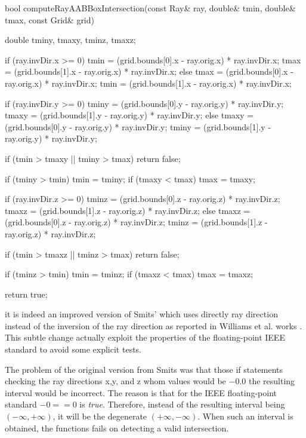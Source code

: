 \documentclass[12pt,a4paper]{extarticle}
\newcommand{\linespace}{\vspace{0pt}}
\begin{document}
\begin{cpp}[caption={Ray-box intersection checking function that also return the points in space along the ray of intersection.},label=code:intersection]
bool computeRayAABBoxIntersection(const Ray& ray, 
		double& tmin, double& tmax, const Grid& grid) {
	double  tminy, tmaxy, tminz, tmaxz;

	if (ray.invDir.x >= 0) {
		tmin = (grid.bounds[0].x - ray.orig.x) * ray.invDir.x;
		tmax = (grid.bounds[1].x - ray.orig.x) * ray.invDir.x;
	}
	else {
		tmax = (grid.bounds[0].x - ray.orig.x) * ray.invDir.x;
		tmin = (grid.bounds[1].x - ray.orig.x) * ray.invDir.x;
	}

	if (ray.invDir.y >= 0) {
		tminy = (grid.bounds[0].y - ray.orig.y) * ray.invDir.y;
		tmaxy = (grid.bounds[1].y - ray.orig.y) * ray.invDir.y;
	}
	else {
		tmaxy = (grid.bounds[0].y - ray.orig.y) * ray.invDir.y;
		tminy = (grid.bounds[1].y - ray.orig.y) * ray.invDir.y;
	}

	if (tmin > tmaxy || tminy > tmax) return false;

	if (tminy > tmin) tmin = tminy;
	if (tmaxy < tmax) tmax = tmaxy;

	if (ray.invDir.z >= 0) {
		tminz = (grid.bounds[0].z - ray.orig.z) * ray.invDir.z;
		tmaxz = (grid.bounds[1].z - ray.orig.z) * ray.invDir.z;
	}
	else {
		tmaxz = (grid.bounds[0].z - ray.orig.z) * ray.invDir.z;
		tminz = (grid.bounds[1].z - ray.orig.z) * ray.invDir.z;
	}

	if (tmin > tmaxz || tminz > tmax) return false;

	if (tminz > tmin) tmin = tminz;
	if (tmaxz < tmax) tmax = tmaxz;

	return true;
}
\end{cpp}


\cite{Williams:2005} it is indeed an improved version of Smits' \cite{Smits:1998}
which uses directly ray direction instead of the inversion of the ray direction as reported in Williams et al. works \cite{Williams:2005}. This subtle change actually exploit the properties of the floating-point IEEE standard \cite{IEEE:30711} to avoid some explicit tests. 
\linespace

The problem of the original version from Smits was that those if statements checking the ray directions x,y, and z whom values would be $-0.0$ the resulting interval would be incorrect. The reason is that for the IEEE floating-point standard $-0 == 0$ is \emph{true}. Therefore, instead of the resulting interval being $(-\infty, +\infty)$, it will be the degenerate $(+\infty,-\infty)$. When such an interval is obtained, the functions fails on detecting a valid intersection.
\linespace
\end{document}
